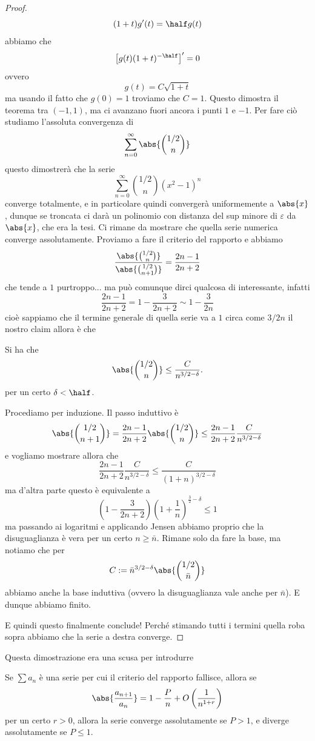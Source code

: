 \documentclass[11pt]{scrartcl}
\begin{document}
\begin{proof}
		$$(1+t)g'(t)=\half g(t)$$
		abbiamo che
		$$\left[g(t)(1+t)^{-\half}\right]'=0$$
		ovvero 
		$$g(t)=C\sqrt{1+t}$$
		ma usando il fatto che $g(0)=1$ troviamo che $C=1$. Questo dimostra il teorema tra $(-1,1)$, ma ci avanzano fuori ancora i punti $1$ e $-1$. Per fare ciò studiamo l'assoluta convergenza di 
		$$\sum_{n=0}^{\infty}\abs{\binom{1/2}{n}}$$
		questo dimostrerà che la serie 
		$$\sum_{n=0}^{\infty} \binom{1/2}{n}\left(x^2-1\right)^n$$
		converge totalmente, e in particolare quindi convergerà uniformemente a $\abs{x}$, dunque se troncata ci darà un polinomio con distanza del sup minore di $\varepsilon$ da $\abs{x}$, che era la tesi. Ci rimane da mostrare che quella serie numerica converge assolutamente. Proviamo a fare il criterio del rapporto e abbiamo
		$$\frac{\abs{\binom{1/2}{n}}}{\abs{\binom{1/2}{n+1}}}=\frac{2n-1}{2n+2}$$
		che tende a $1$ purtroppo... ma può comunque dirci qualcosa di interessante, infatti
		$$\frac{2n-1}{2n+2}=1-\frac{3}{2n+2}\sim 1-\frac{3}{2n}$$
		cioè sappiamo che il termine generale di quella serie va a $1$ circa come $3/2n$ il nostro claim allora è che
		\begin{claim}
			Si ha che
			$$\abs{\binom{1/2}{n}}\le \frac{C}{n^{3/2-\delta}}.$$
			per un certo $\delta<\half$.
		\end{claim}
		\begin{subproof}[Sottodimostrazione]
			Procediamo per induzione. Il passo induttivo è 
			$$\abs{\binom{1/2}{n+1}}=\frac{2n-1}{2n+2}\abs{\binom{1/2}{n}}\le \frac{2n-1}{2n+2}\frac{C}{n^{3/2-\delta}}$$
			e vogliamo mostrare allora che 
			$$\frac{2n-1}{2n+2}\frac{C}{n^{3/2-\delta}}\le \frac{C}{\left(1+n\right)^{3/2-\delta}}$$
			ma d'altra parte questo è equivalente a 
			$$\left(1-\frac{3}{2n+2}\right)\left(1+\frac{1}{n}\right)^{\frac{3}{2}-\delta}\le 1$$
			ma passando ai logaritmi e applicando Jensen abbiamo proprio che la disuguaglianza è vera per un certo $n\ge \bar{n}$. Rimane solo da fare la base, ma notiamo che per 
			$$C:=\bar{n}^{3/2-\delta}\abs{\binom{1/2}{\bar{n}}}$$
			abbiamo anche la base induttiva (ovvero la disuguaglianza vale anche per $\bar{n}$). E dunque abbiamo finito.
		\end{subproof}
		E quindi questo finalmente conclude! Perché stimando tutti i termini quella roba sopra abbiamo che la serie a destra converge.
	\end{proof}
	Questa dimostrazione era una scusa per introdurre
	\begin{lemma}
		Se $\sum a_n$ è una serie per cui il criterio del rapporto fallisce, allora se 
		$$\abs{\frac{a_{n+1}}{a_n}}=1-\frac{P}{n}+O\left(\frac{1}{n^{1+r}}\right)$$
		per un certo $r>0$, allora la serie converge assolutamente se $P>1$, e diverge assolutamente se $P\le 1$.
	\end{lemma}
\end{document}
